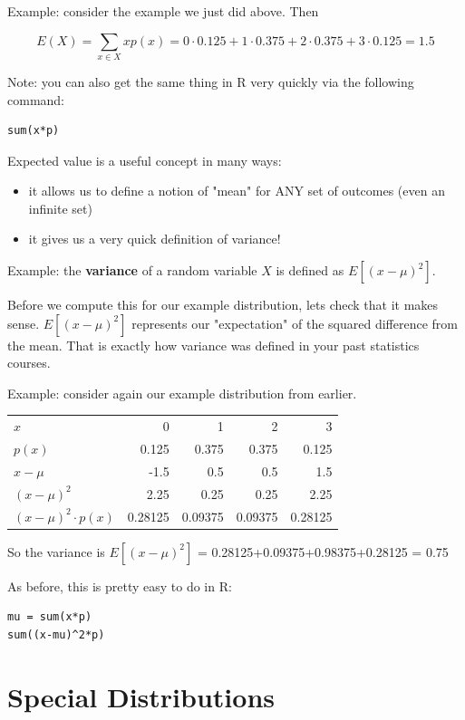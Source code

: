 \documentclass[11pt]{article}
\begin{document}
Example: consider the example we just did above.  Then

\[
E(X) = \sum_{x\in X}xp(x) = 0\cdot 0.125 + 1\cdot 0.375 +2\cdot 0.375 + 3\cdot 0.125 = 1.5
\]

Note: you can also get the same thing in R very quickly via the following command:

\begin{verbatim}
sum(x*p)
\end{verbatim}

Expected value is a useful concept in many ways:
\begin{itemize}
\item it allows us to define a notion of "mean" for ANY set of outcomes (even an infinite set)
\item it gives us a very quick definition of variance!
\end{itemize}

Example: the \textbf{variance} of a random variable $X$ is defined as $E[(x-\mu)^2]$.

Before we compute this for our example distribution, lets check that it makes sense.  $E[(x-\mu)^2]$ represents our "expectation" of the squared difference from the mean.  That is exactly how variance was defined in your past statistics courses.

Example: consider again our example distribution from earlier.

\begin{center}
\begin{tabular}{lrrrr}
$x$ & 0 & 1 & 2 & 3\\
$p(x)$ & 0.125 & 0.375 & 0.375 & 0.125\\
$x-\mu$ & -1.5 & 0.5 & 0.5 & 1.5\\
$(x-\mu)^2$ & 2.25 & 0.25 & 0.25 & 2.25\\
$(x-\mu)^2\cdot p(x)$ & 0.28125 & 0.09375 & 0.09375 & 0.28125\\
\end{tabular}
\end{center}

So the variance is $E[(x-\mu)^2]$ = 0.28125+0.09375+0.98375+0.28125 = 0.75

As before, this is pretty easy to do in R:

\begin{verbatim}
mu = sum(x*p)
sum((x-mu)^2*p)
\end{verbatim}

\section*{Special Distributions}
\label{sec-3}
\end{document}
